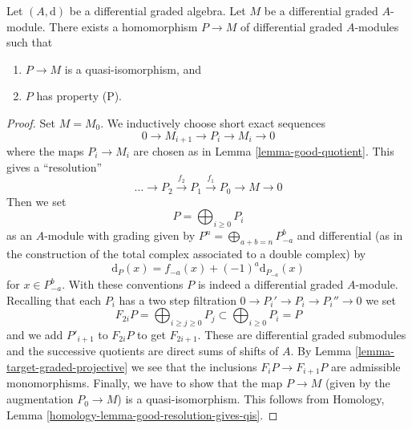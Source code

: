 \begin{lemma}
\label{lemma-resolve}
Let $(A, \text{d})$ be a differential graded algebra.
Let $M$ be a differential graded $A$-module. There exists a homomorphism
$P \to M$ of differential graded $A$-modules such that
\begin{enumerate}
\item $P \to M$ is a quasi-isomorphism, and
\item $P$ has property (P).
\end{enumerate}
\end{lemma}

\begin{proof}
Set $M = M_0$. We inductively choose short exact sequences
$$
0 \to M_{i + 1} \to P_i \to M_i \to 0
$$
where the maps $P_i \to M_i$ are chosen as in Lemma \ref{lemma-good-quotient}.
This gives a ``resolution''
$$
\ldots \to P_2 \xrightarrow{f_2} P_1 \xrightarrow{f_1} P_0 \to M \to 0
$$
Then we set
$$
P = \bigoplus\nolimits_{i \geq 0} P_i
$$
as an $A$-module with grading given by
$P^n = \bigoplus_{a + b = n} P_{-a}^b$ and
differential (as in the construction of the total complex associated
to a double complex) by
$$
\text{d}_P(x) = f_{-a}(x) + (-1)^a \text{d}_{P_{-a}}(x)
$$
for $x \in P_{-a}^b$. With these conventions $P$ is indeed a differential
graded $A$-module. Recalling that each $P_i$ has a two step filtration
$0 \to P_i' \to P_i \to P_i'' \to 0$ we set
$$
F_{2i}P = \bigoplus\nolimits_{i \geq j \geq 0} P_j
\subset
\bigoplus\nolimits_{i \geq 0} P_i = P
$$
and we add $P'_{i + 1}$ to $F_{2i}P$ to get $F_{2i + 1}$.
These are differential graded submodules and the successive quotients
are direct sums of shifts of $A$. By
Lemma \ref{lemma-target-graded-projective} we see that
the inclusions $F_iP \to F_{i + 1}P$ are admissible monomorphisms.
Finally, we have to show that the map $P \to M$ (given by the
augmentation $P_0 \to M$) is a quasi-isomorphism. This follows from
Homology, Lemma \ref{homology-lemma-good-resolution-gives-qis}.
\end{proof}
